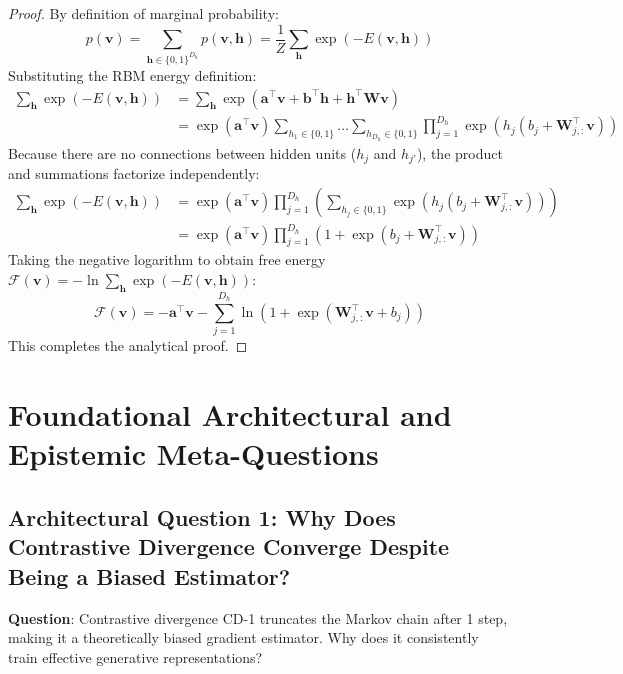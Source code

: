 \documentclass[11pt,a4paper]{article}
\theoremstyle{definition}
\begin{document}
\begin{proof}
By definition of marginal probability:
{\boldmath
\begin{equation}
p(\mathbf{v}) = \sum_{\mathbf{h} \in \{0, 1\}^{D_h}} p(\mathbf{v}, \mathbf{h}) = \frac{1}{Z} \sum_{\mathbf{h}} \exp(-E(\mathbf{v}, \mathbf{h}))
\end{equation}
}
Substituting the RBM energy definition:
{\boldmath
\begin{align}
\sum_{\mathbf{h}} \exp(-E(\mathbf{v}, \mathbf{h})) &= \sum_{\mathbf{h}} \exp\left( \mathbf{a}^\top \mathbf{v} + \mathbf{b}^\top \mathbf{h} + \mathbf{h}^\top \mathbf{W} \mathbf{v} \right) \\
&= \exp(\mathbf{a}^\top \mathbf{v}) \sum_{h_1 \in \{0, 1\}} \dots \sum_{h_{D_h} \in \{0, 1\}} \prod_{j=1}^{D_h} \exp\left( h_j (b_j + \mathbf{W}_{j, :}^\top \mathbf{v}) \right)
\end{align}
}
Because there are no connections between hidden units ($h_j$ and $h_{j'}$), the product and summations factorize independently:
{\boldmath
\begin{align}
\sum_{\mathbf{h}} \exp(-E(\mathbf{v}, \mathbf{h})) &= \exp(\mathbf{a}^\top \mathbf{v}) \prod_{j=1}^{D_h} \left( \sum_{h_j \in \{0, 1\}} \exp\left( h_j (b_j + \mathbf{W}_{j, :}^\top \mathbf{v}) \right) \right) \\
&= \exp(\mathbf{a}^\top \mathbf{v}) \prod_{j=1}^{D_h} \left( 1 + \exp(b_j + \mathbf{W}_{j, :}^\top \mathbf{v}) \right)
\end{align}
}
Taking the negative logarithm to obtain free energy $\mathcal{F}(\mathbf{v}) = -\ln \sum_{\mathbf{h}} \exp(-E(\mathbf{v}, \mathbf{h}))$:
{\boldmath
\begin{equation}
\mathcal{F}(\mathbf{v}) = -\mathbf{a}^\top \mathbf{v} - \sum_{j=1}^{D_h} \ln\left( 1 + \exp\left( \mathbf{W}_{j, :}^\top \mathbf{v} + b_j \right) \right)
\end{equation}
}
This completes the analytical proof.
\end{proof}

\section{Foundational Architectural and Epistemic Meta-Questions}

\subsection{Architectural Question 1: Why Does Contrastive Divergence Converge Despite Being a Biased Estimator?}
\textbf{Question}: Contrastive divergence CD-1 truncates the Markov chain after 1 step, making it a theoretically biased gradient estimator. Why does it consistently train effective generative representations?
\end{document}
